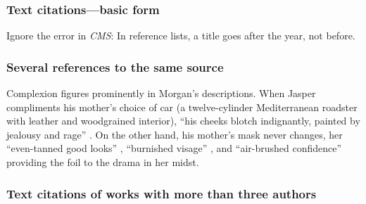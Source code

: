 \documentclass[11pt,letterpaper,oneside]{article}
\begin{document}
\begin{citeref}
\item \parencite[218]{fogel2004b}
\item \parencite[45--46]{fogel2004a}
\end{citeref}

\setcounter{subsubsection}{21}
\subsubsection{Text citations---basic form}

Ignore the error in \textit{CMS}: In reference lists, a title goes
after the year, not before.

\begin{citeref}
\item \parencite{hetherington2015,grove2015}
\end{citeref}

\begin{citeref}
\item \parencite{doershuk2017}
\item \parencite{doershuk2016}
\end{citeref}

\setcounter{subsubsection}{26}
\subsubsection{Several references to the same source}

\begin{citeref}%
\item Complexion figures prominently in Morgan's descriptions. When
Jasper compliments his mother's choice of car (a twelve-cylinder
Mediterranean roadster with leather and wood\-grained interior), ``his
cheeks blotch indignantly, painted by jealousy and rage''
\parencite[47]{chaston2000}. On the other hand, his mother's mask
never changes, her ``even-tanned good looks''
\parencite[56]{chaston2000}, ``burnished visage''
\parencite[101]{chaston2000}, and ``air-brushed confidence''
\parencite[211]{chaston2000} providing the foil to the drama in her
midst.
\end{citeref}

\setcounter{subsubsection}{28}
\subsubsection{Text citations of works with more than three authors}
\end{document}
